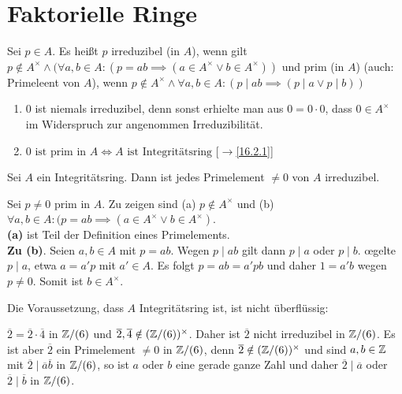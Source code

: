 \documentclass[../../main.tex]{subfiles}
\begin{document}
\section{Faktorielle Ringe}

\begin{df}\label{16.4.1}
Sei $p\in A$. Es heißt $p$ irreduzibel (in $A$), wenn gilt $p\notin A^\times\land (\forall a,b\in A:(p=ab\implies (a\in A^\times\lor b\in A^\times))$ und prim (in $A$) (auch: Primeleent von $A$), wenn $p\notin A^\times\land \forall a,b\in A: (p\mid ab\implies (p\mid a\lor p\mid b))$
\end{df}

\begin{bem}\label{16.4.2}
\begin{enumerate}[\normalfont(a)]
\item $0$ ist niemals irreduzibel, denn sonst erhielte man aus $0= 0\cdot 0$, dass $0\in A^\times$ im Widerspruch zur angenommen Irreduzibilität.
\item $0\text{ ist prim in }A\Longleftrightarrow A\text{ ist Integritätsring}$ [$\to$\ref{16.2.1}]
\end{enumerate}
\end{bem}

\begin{pro}\label{16.4.3}
Sei $A$ ein Integritätsring. Dann ist jedes Primelement $\neq 0$ von $A$ irreduzibel.
\end{pro}
\begin{cproof}
Sei $p\neq 0$ prim in $A$. Zu zeigen sind (a) $p\notin A^\times$ und (b) $\forall a,b\in A:(p=ab\implies (a\in A^\times\lor b\in A^\times)$.\\

\noindent\textbf{(a)} ist Teil der Definition eines Primelements.\\

\noindent\textbf{Zu (b)}. Seien $a,b\in A$ mit $p=ab$. Wegen $p\mid ab$ gilt dann $p\mid a $ oder $p\mid b$. \oe gelte $p\mid a$, etwa $a=a'p$ mit $a'\in A$. Es folgt $p=ab=a'pb$ und daher $1=a'b$ wegen $p\neq 0$. Somit ist $b\in A^\times$.
\end{cproof}

Die Voraussetzung, dass $A$ Integritätsring ist, ist nicht überflüssig:
\begin{bsp}\label{16.4.4}
$\overline{2}=\overline{2}\cdot \overline{4}$ in $\mathbb Z/(6)$ und $\overline{2},\overline{4}\notin (\mathbb Z/(6))^\times$. Daher ist $\overline{2}$ nicht irreduzibel in $\mathbb Z/(6)$. Es ist aber $\overline{2}$ ein Primelement $\neq 0$ in $\mathbb Z/(6)$, denn $\overline{2}\notin (\mathbb Z/(6))^\times$ und sind $a,b\in \mathbb Z$ mit $\overline{2}\mid \overline{a}\overline{b}$ in $\mathbb Z/(6)$, so ist $a$ oder $b$ eine gerade ganze Zahl und daher $\overline{2}\mid \overline{a}$ oder $\overline{2}\mid \overline{b}$ in $\mathbb Z/(6)$.
\end{bsp}
\end{document}
